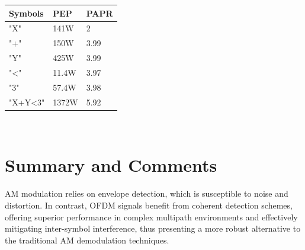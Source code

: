 \documentclass[a4paper, twocolumn]{article}
\begin{document}
        \begin{tabular}{|l|l|l|}
        \hline
        \textbf{Symbols} & \textbf{PEP} & \textbf{PAPR} \\ \hline
        "X" & 141W & 2 \\ \hline
        "+" & 150W & 3.99 \\ \hline
        "Y" & 425W & 3.99 \\ \hline
        "\textless" & 11.4W & 3.97 \\ \hline
        "3" & 57.4W & 3.98 \\ \hline
        "X+Y\textless3" & 1372W & 5.92 \\ \hline
        \end{tabular} \\

        \section{Summary and Comments}
        AM modulation relies on envelope detection, which is susceptible to noise and distortion. In contrast, OFDM signals benefit from coherent detection schemes, offering superior performance in complex multipath environments and effectively mitigating inter-symbol interference, thus presenting a more robust alternative to the traditional AM demodulation techniques.
        
        
\end{document}
